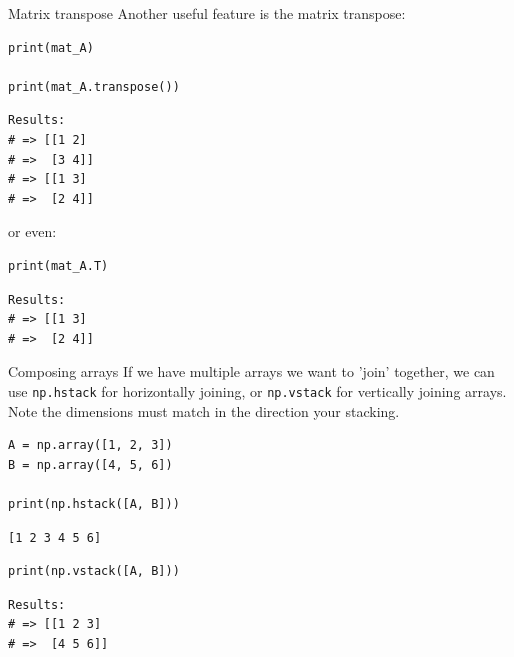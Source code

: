 \documentclass[10pt]{beamer}
\begin{document}
\begin{frame}[label={sec:org3ab4fc5},fragile]{Matrix transpose}
 Another useful feature is the matrix transpose:

\begin{verbatim}
print(mat_A)

print(mat_A.transpose())
\end{verbatim}

\begin{verbatim}
Results: 
# => [[1 2]
# =>  [3 4]]
# => [[1 3]
# =>  [2 4]]
\end{verbatim}


or even:

\begin{verbatim}
print(mat_A.T)
\end{verbatim}

\begin{verbatim}
Results: 
# => [[1 3]
# =>  [2 4]]
\end{verbatim}
\end{frame}


\begin{frame}[label={sec:orgb3e169c},fragile]{Composing arrays}
 If we have multiple arrays we want to 'join' together, we can use \texttt{np.hstack} for
horizontally joining, or \texttt{np.vstack} for vertically joining arrays. \alert{Note} the dimensions
must match in the direction your stacking.

\begin{verbatim}
A = np.array([1, 2, 3])
B = np.array([4, 5, 6])

print(np.hstack([A, B]))
\end{verbatim}

\begin{verbatim}
[1 2 3 4 5 6]
\end{verbatim}


\begin{verbatim}
print(np.vstack([A, B]))
\end{verbatim}

\begin{verbatim}
Results: 
# => [[1 2 3]
# =>  [4 5 6]]
\end{verbatim}
\end{frame}
\end{document}
